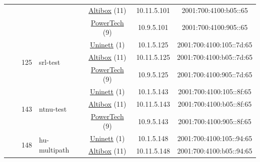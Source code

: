 \begin{small}
\begin{center}
\begin{longtable}{|c|c|c|c|c|c|c|c|}
  &  & \multicolumn{2}{|c|}{} & \multicolumn{2}{|c|}{\tiny{\href{https://www.altibox.no}{Altibox} (11)}} & \tiny{10.11.5.101} & \tiny{2001:700:4100:b05::65} \\* \cline{5-5}\cline{6-6}\cline{7-7}\cline{8-8}
  &  & \multicolumn{2}{|c|}{} & \multicolumn{2}{|c|}{\tiny{\href{http://www.powertech.no}{PowerTech} (9)}} & \tiny{10.9.5.101} & \tiny{2001:700:4100:905::65} \\* \cline{3-3}\cline{4-4}\cline{5-5}\cline{6-6}\cline{7-7}\cline{8-8}
  &  & \multirow{3}{*}{\tiny{125}} & \multicolumn{1}{|l|}{\multirow{3}{*}{\tiny{srl-test}}} & \multicolumn{2}{|c|}{\tiny{\href{https://www.uninett.no}{Uninett} (1)}} & \tiny{10.1.5.125} & \tiny{2001:700:4100:105::7d:65} \\* \cline{5-5}\cline{6-6}\cline{7-7}\cline{8-8}
  &  &  &  & \multicolumn{2}{|c|}{\tiny{\href{https://www.altibox.no}{Altibox} (11)}} & \tiny{10.11.5.125} & \tiny{2001:700:4100:b05::7d:65} \\* \cline{5-5}\cline{6-6}\cline{7-7}\cline{8-8}
  &  &  &  & \multicolumn{2}{|c|}{\tiny{\href{http://www.powertech.no}{PowerTech} (9)}} & \tiny{10.9.5.125} & \tiny{2001:700:4100:905::7d:65} \\* \cline{3-3}\cline{4-4}\cline{5-5}\cline{6-6}\cline{7-7}\cline{8-8}
  &  & \multirow{3}{*}{\tiny{143}} & \multicolumn{1}{|l|}{\multirow{3}{*}{\tiny{ntnu-test}}} & \multicolumn{2}{|c|}{\tiny{\href{https://www.uninett.no}{Uninett} (1)}} & \tiny{10.1.5.143} & \tiny{2001:700:4100:105::8f:65} \\* \cline{5-5}\cline{6-6}\cline{7-7}\cline{8-8}
  &  &  &  & \multicolumn{2}{|c|}{\tiny{\href{https://www.altibox.no}{Altibox} (11)}} & \tiny{10.11.5.143} & \tiny{2001:700:4100:b05::8f:65} \\* \cline{5-5}\cline{6-6}\cline{7-7}\cline{8-8}
  &  &  &  & \multicolumn{2}{|c|}{\tiny{\href{http://www.powertech.no}{PowerTech} (9)}} & \tiny{10.9.5.143} & \tiny{2001:700:4100:905::8f:65} \\* \cline{3-3}\cline{4-4}\cline{5-5}\cline{6-6}\cline{7-7}\cline{8-8}
  &  & \multirow{3}{*}{\tiny{148}} & \multicolumn{1}{|l|}{\multirow{3}{*}{\tiny{hu-multipath}}} & \multicolumn{2}{|c|}{\tiny{\href{https://www.uninett.no}{Uninett} (1)}} & \tiny{10.1.5.148} & \tiny{2001:700:4100:105::94:65} \\* \cline{5-5}\cline{6-6}\cline{7-7}\cline{8-8}
  &  &  &  & \multicolumn{2}{|c|}{\tiny{\href{https://www.altibox.no}{Altibox} (11)}} & \tiny{10.11.5.148} & \tiny{2001:700:4100:b05::94:65} \\* \cline{5-5}\cline{6-6}\cline{7-7}\cline{8-8}

\end{longtable}
\end{center}
\end{small}
